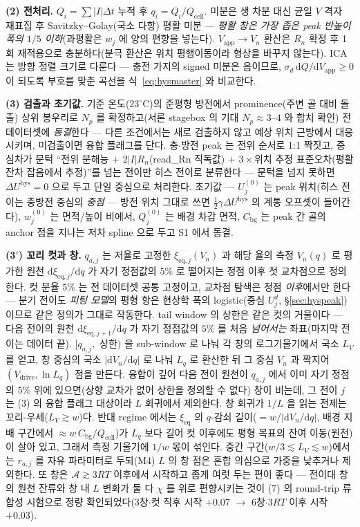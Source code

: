 \documentclass[11pt,a4paper]{article}
\newcommand{\dd}{\mathrm{d}}
\newcommand{\eq}{\mathrm{eq}}
\newcommand{\app}{\mathrm{app}}
\newcommand{\drive}{\mathrm{drive}}
\newcommand{\cell}{\mathrm{cell}}
\newcommand{\bg}{\mathrm{bg}}
\newcommand{\hys}{\mathrm{hys}}
\begin{document}
\textbf{(2) 전처리.} $Q_i=\sum|I|\Delta t$ 누적 후 $q_i=Q_i/Q_\cell$. 미분은 생 차분 대신 균일 $V$
격자 재표집 후 Savitzky--Golay(국소 다항) 평활 미분 — \emph{평활 창은 가장 좁은 peak 반높이 폭의 $1/5$
이하}(과평활은 $w_j$ 에 양의 편향을 넣는다). $V_\app\to V_n$ 환산은 $R_n$ 확정 후 1회 재적용으로 충분하다(분극
환산은 위치 평행이동이라 형상을 바꾸지 않는다). ICA 는 방향 정렬 크기로 다룬다 — 충전 가지의 signed
미분은 음이므로, $\sigma_d\,\dd Q/\dd V_\app\ge0$ 이 되도록 부호를 맞춘 곡선을
식~\eqref{eq:hysmaster} 와 비교한다.

\textbf{(3) 검출과 초기값.} 기준 온도($23^\circ$C)의 준평형 방전에서 prominence(주변 골 대비 돌출) 상위 봉우리로
$N_p$ 를 확정하고(서론 stagebox 의 기대 $N_p\approx3$--$4$ 와 합치 확인) 전 데이터셋에
\emph{동결}한다 — 다른 조건에서는 새로 검출하지 않고 예상 위치 근방에서
대응시키며, 미검출이면 융합 플래그를 단다. 충$\cdot$방전 peak 는 전위 순서로 1:1 짝짓고, 중심차가 문턱 ``전위 분해능 $+$ $2|I|R_n$(read\_Rn
직독값) $+$ $3\times$위치 추정 표준오차(평활 잔차 잡음에서 추정)''를 넘는 전이만 히스 전이로 분류한다 — 문턱을
넘지 못하면 $\Delta U^\hys=0$ 으로 두고 단일 중심으로 처리한다. 초기값 — $U_j^{(0)}$ 는 peak 위치(히스 전이는
충방전 중심의 \emph{중점} — 방전 위치 그대로 쓰면 $\tfrac12\gamma\Delta U^\hys$ 의 계통 오프셋이
들어간다), $w_j^{(0)}$ 는 면적/높이 비에서, $Q_j^{(0)}$ 는 배경 차감 면적, $C_\bg$ 는 peak 간 골의
anchor 점을 지나는 저차 spline 으로 두고 S1 에서 동결.

\textbf{(3$'$) 꼬리 컷과 창.} $q_{a,j}$ 는 저율로 고정한 $\xi_{\eq,j}(V_n)$ 과 해당 율의 측정
$V_n(q)$ 로 평가한 원천 $\dd\xi_{\eq,j}/\dd q$ 가 자기 정점값의 $5\%$ 로 떨어지는 정점 이후 첫
교차점으로 정의한다. 컷 분율 $5\%$ 는 전 데이터셋 공통 고정이고, 교차점 탐색은 정점 \emph{이후}에서만
한다 — 분기 전이도 \emph{피팅 모델}의 평형 항은 현상학 폭의 logistic(중심 $U_j^d$,
\S\ref{sec:hyspeak})이므로 같은 정의가 그대로 작동한다.
tail window 의 상한은 같은 컷의 거울이다 — 다음 전이의 원천 $\dd\xi_{\eq,j+1}/\dd q$ 가 자기 정점값의
$5\%$ 를 처음 \emph{넘어서는} 좌표(마지막 전이는 데이터 끝). $[q_{a,j},$ 상한$)$ 을 sub-window 로
나눠 각 창의 로그기울기에서 국소 $L_V$ 를 얻고, 창 중심의 국소 $|\dd V_n/\dd q|$ 로 나눠 $L_q$ 로
환산한 뒤 그 중심 $V_n$ 과 짝지어 $(V_\drive,\ln L_q)$ 점을 만든다. 융합이 깊어 다음 전이 원천이 $q_{a,j}$ 에서 이미 자기 정점의 $5\%$ 위에 있으면(상향
교차가 없어 상한을 정의할 수 없다) 창이 비는데, 그 전이 $j$ 는 (3) 의 융합 플래그 대상이라 $L$
회귀에서 제외한다. 창 회귀가 $1/L$ 을 읽는 전제는 꼬리-우세($L_V\gtrsim w$)다. 반대 regime 에서는 $\xi_{\eq}$ 의
$q$-감쇠 길이($=w/|\dd V_n/\dd q|$, 배경 지배 구간에서 $\approx w\,C_\bg/Q_\cell$)가 $L_q$ 보다
길어 컷 이후에도 평형 목표의 잔여 이동(원천)이 살아 있고, 그래서 측정 기울기에 $1/w$ 몫이 섞인다. 중간 구간($w/3\lesssim L_V\lesssim w$)에서는 $r_{a,j}$ 를 자유
파라미터로 두되(M4) $L$ 의 창 점은 혼합 의심으로 가중을 낮추거나 제외한다. 또 창은
$\mathcal A\gtrsim3RT$ 이후에서 시작하고 좁게 여럿 두는 편이 좋다 — 전이대 창의 원천 잔류와 창 내
$L$ 변화가 둘 다 $\chi$ 를 위로 편향시키는 것이 (7) 의 round-trip 류 합성 시험으로 정량
확인되었다(3창$\cdot$컷 직후 시작 $+0.07$ $\to$ 6창$\cdot$$3RT$ 이후 시작 $+0.03$).
\end{document}

